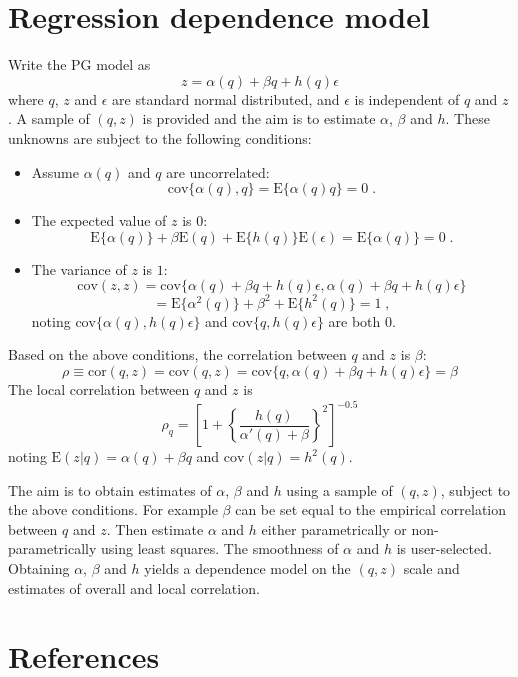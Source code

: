 \documentclass[authoryear]{elsarticle}
\newcommand{\E}{\mathrm{E}}
\newcommand{\cov}{\mathrm{cov}}
\newcommand{\eps}{\epsilon}
\newcommand{\cor}{\mathrm{cor}}
\newcommand{\bi}{\begin{itemize}}
\newcommand{\ei}{\end{itemize}}
\renewcommand{\i}{\item}
\begin{document}
\section{Regression dependence model}

Write the PG model as 
$$
z=\alpha(q)+\beta q + h(q)\epsilon 
$$
where $q$, $z$ and $\eps$ are standard normal distributed, and $\epsilon$ is independent of $q$ and $z$. A sample of $(q,z)$ is provided and the aim is to estimate $\alpha$, $\beta$ and $h$. These unknowns are subject to the following conditions:
\bi
\i Assume $\alpha(q)$ and $q$ are uncorrelated:
$$
\cov\{\alpha(q),q\} = \E\{\alpha(q)q\} =0 \;.
$$

\i The expected value of $z$ is $0$:
$$
\E\{\alpha(q)\}+\beta\E(q)+\E\{h(q)\}\E(\eps) = \E\{\alpha(q)\}=0 \;.
$$

\i The variance of $z$ is $1$:
$$
\cov(z,z)=\cov\{\alpha(q)+\beta q+h(q)\eps, \alpha(q)+\beta q+h(q)\eps\}
$$
$$
=\E\{\alpha^2(q)\}+ \beta^2+\E\{h^2(q)\} = 1 \;,
$$
noting $\cov\{\alpha(q),h(q)\eps\}$ and $\cov\{q,h(q)\eps\}$ are both $0$.

\ei
Based on the above conditions, the correlation between $q$ and $z$ is $\beta$:
$$
\rho\equiv \cor(q,z) = \cov(q,z)=\cov\{q,\alpha(q)+\beta q + h(q)\eps\} = \beta 
$$
The local correlation between $q$ and $z$ is
$$
\rho_q  = \left[1+\left\{\frac{h(q)}{\alpha'(q)+\beta}\right\}^2\right]^{-0.5}
$$
noting $\E(z|q)=\alpha(q)+\beta q$ and $\cov(z|q)=h^2(q)$.


The aim is to obtain estimates of $\alpha$, $\beta$ and $h$ using a sample of $(q,z)$, subject to the above conditions. For example $\beta$ can be set equal to the empirical correlation between $q$ and $z$. Then estimate $\alpha$ and $h$ either parametrically or non-parametrically using least squares. The smoothness of $\alpha$ and $h$ is user-selected. Obtaining $\alpha$, $\beta$ and $h$ yields a dependence model on the $(q,z)$ scale and estimates of overall and local correlation.

\section*{References}

\end{document}
